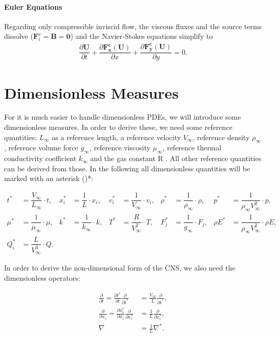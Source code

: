 			\paragraph{Euler Equations}
			Regarding only compressible inviscid flow, the viscous fluxes and the source terms dissolve ($\mathbf{F}_i^v = \mathbf{B} = \mathbf{0}$) and the Navier-Stokes equations simplify to
			\begin{align}
				\dfrac{\partial \mathbf{U}}{\partial t} + \dfrac{\partial \mathbf{F_x^c(U)}}{\partial x} + \dfrac{\partial \mathbf{F_y^c(U)}}{\partial y} = 0.
			\end{align}
	
	
	\section{Dimensionless Measures}
	For it is much easier to handle dimensionless PDEs, we will introduce some dimensionless measures. In order to derive these, we need some reference quantities: $L_\infty$ as a reference length, a reference velocity $V_\infty$, reference density $\rho_\infty$, reference volume force $g_\infty$, reference viscosity $\mu_\infty$, reference thermal conductivity coefficient $k_\infty$ and the gas constant R . All other reference quantities can be derived from those. In the following all dimensionless quantities will be marked with an asterisk ()*:
	
	\begin{align}
		t^* &= \dfrac{V_\infty}{L_\infty} \cdot t,& x_i^* &= \dfrac{1}{L} \cdot x_i, & v_i^* &= \dfrac{1}{V_\infty}\cdot v_i, & \rho^* &= \dfrac{1}{\rho_\infty} \cdot \rho, & p^* &= \dfrac{1}{\rho_\infty V_\infty^2} \cdot p, \\ \nonumber
		 \mu^* &= \dfrac{1}{\mu_\infty} \cdot \mu , & k^* &= \dfrac{1}{k_\infty} \cdot k,&  T^* &= \dfrac{R}{V_\infty^2}\cdot T, & F_j^*& = \dfrac{1}{g_\infty} \cdot F_j, & \rho E^* &= \dfrac{1}{\rho_\infty V_\infty^2} \cdot \rho E, \\ \nonumber
		 Q_i^* &= \dfrac{L}{V_\infty^3} \cdot Q. &
	\end{align}
	
	In order to derive the non-dimensional form of the CNS, we also need the dimensionless operators:
	
	\begin{align}
		\frac{\partial}{\partial t}= \frac{\partial t^*}{\partial t} \frac{\partial}{\partial t^*} &= \frac{V_\infty}{L} \frac{\partial}{\partial t^*}, \\
		\frac{\partial}{\partial x_i} = \frac{\partial x_i^*}{\partial x_i} \frac{\partial}{\partial x_i^*} &= \frac{1}{L} \frac{\partial}{\partial x_i^*}, \\
		\nabla &= \frac{1}{L} \nabla^*.
	\end{align}
	
